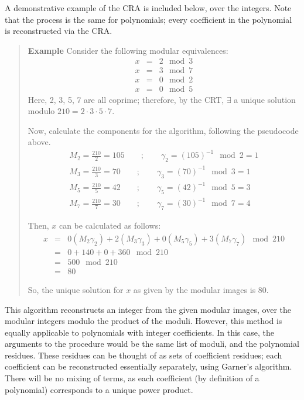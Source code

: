\documentclass[letterpaper,12pt,titlepage,oneside,final]{book}
\newenvironment{example}{\begin{quote}%
  \textbf{Example }%
  \quad
}{%
\end{quote}%
}
\begin{document}
A demonstrative example of the CRA is included below, over the integers.  Note that the process is the same for polynomials; every coefficient in the polynomial is reconstructed via the CRA.

\begin{example}\label{CRA}
  Consider the following modular equivalences:
  \begin{eqnarray*}
    x &=& 2 \mod 3\\
    x &=& 3 \mod 7\\
    x &=& 0 \mod 2\\
    x &=& 0 \mod 5
  \end{eqnarray*}  
  Here, 2, 3, 5, 7 are all coprime; therefore, by the CRT, ${\exists}$ a unique solution modulo ${210 = 2 \cdot 3 \cdot 5 \cdot 7}$. 

  Now, calculate the components for the algorithm, following the pseudocode above.
  \begin{eqnarray*}
    M_2 = \frac{210}{2} = 105 \qquad ; \qquad \gamma_2 = (105)^{-1} \mod 2 = 1\\
    M_3 = \frac{210}{3} = 70 \qquad ; \qquad \gamma_3 = (70)^{-1} \mod 3 = 1\\
    M_5 = \frac{210}{5} = 42 \qquad ; \qquad \gamma_5 = (42)^{-1} \mod 5 = 3\\
    M_7 = \frac{210}{7} = 30 \qquad ; \qquad \gamma_7 = (30)^{-1} \mod 7 = 4
  \end{eqnarray*}

  Then, ${x}$ can be calculated as follows:
  \begin{eqnarray*}
    x &=& 0(M_2\gamma_2) + 2(M_3\gamma_3) + 0(M_5\gamma_5) + 3(M_7\gamma_7) \mod 210\\
      &=& 0 + 140 + 0 + 360 \mod 210\\
      &=& 500 \mod 210\\
      &=& 80
  \end{eqnarray*}

  So, the unique solution for ${x}$ as given by the modular images is 80.
\end{example}

This algorithm reconstructs an integer from the given modular images, over the modular integers modulo the product of the moduli.  However, this method is equally applicable to polynomials with integer coefficients.  In this case, the arguments to the procedure would be the same list of moduli, and the polynomial residues.  These residues can be thought of as sets of coefficient residues; each coefficient can be reconstructed essentially separately, using Garner's algorithm.  There will be no mixing of terms, as each coefficient (by definition of a polynomial) corresponds to a unique power product. 
\end{document}

